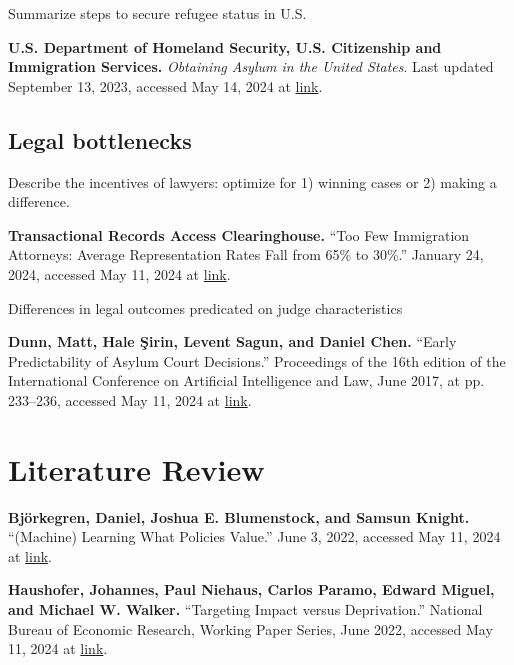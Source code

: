\documentclass{article}
\begin{document}
\noindent Summarize steps to secure refugee status in U.S.\\

\begin{hangparas}{.25in}{1}

\textbf{U.S. Department of Homeland Security, U.S. Citizenship and Immigration Services.} \textit{Obtaining Asylum in the United States}. Last updated September 13, 2023, accessed May 14, 2024 at \href{https://www.uscis.gov/humanitarian/refugees-and-asylum/asylum/obtaining-asylum-in-the-united-states}{link}.

\end{hangparas}

\subsection{Legal bottlenecks}

Describe the incentives of lawyers: optimize for 1) winning cases or 2) making a difference. 

\begin{hangparas}{.25in}{1}

\textbf{Transactional Records Access Clearinghouse.} “Too Few Immigration Attorneys: Average Representation Rates Fall from 65\% to 30\%.” January 24, 2024, accessed May 11, 2024 at \href{https://trac.syr.edu/reports/736/}{link}.\\

\end{hangparas}

\noindent Differences in legal outcomes predicated on judge characteristics\\

\begin{hangparas}{.25in}{1}

\textbf{Dunn, Matt, Hale Şirin, Levent Sagun, and Daniel Chen.} “Early Predictability of Asylum Court Decisions.” Proceedings of the 16th edition of the International Conference on Artificial Intelligence and Law, June 2017, at pp. 233–236, accessed May 11, 2024 at \href{https://tinyurl.com/mpjt4sb5}{link}.

\end{hangparas}

\section{Literature Review}

\begin{hangparas}{.25in}{1}

\textbf{Björkegren, Daniel, Joshua E. Blumenstock, and Samsun Knight.} 
“(Machine) Learning What Policies Value.” June 3, 2022, accessed May 11, 2024 at \href{https://arxiv.org/abs/2206.00727}{link}.

\textbf{Haushofer, Johannes, Paul Niehaus, Carlos Paramo, Edward Miguel, and Michael W. Walker.} “Targeting Impact versus Deprivation.” National Bureau of Economic Research, Working Paper Series, June 2022, accessed May 11, 2024 at \href{https://www.nber.org/papers/w30138}{link}.

\end{hangparas}
\end{document}
